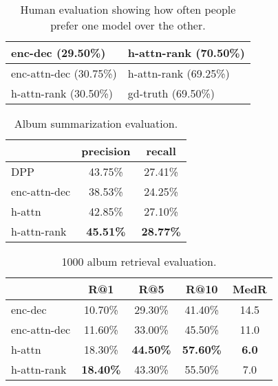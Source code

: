 \begin{table}[t]
\footnotesize
\begin{center}
\begin{tabular}{l | l}
\hline
enc-dec (29.50\%) & h-attn-rank (70.50\%)\\
\hline
enc-attn-dec (30.75\%) & h-attn-rank (69.25\%) \\
\hline
\hline
h-attn-rank (30.50\%) & gd-truth (69.50\%) \\ 
\hline
\end{tabular}
\end{center}
\vspace{-.4cm}
\caption{Human evaluation showing how often people prefer one model over the other.}
\vspace{-.2cm}
\label{table:human}
\end{table}

\begin{table}[t]
\footnotesize
\begin{center}
\begin{tabular}{l | c c }
\hline
& precision & recall \\
\hline
DPP & 43.75\% & 27.41\% \\
\hline
enc-attn-dec & 38.53\% & 24.25\% \\
\hline
h-attn 		 & 42.85\% & 27.10\% \\
\hline
h-attn-rank  & \bf{45.51}\% & \bf{28.77}\% \\
\hline
\end{tabular}
\end{center}
\vspace{-.4cm}
\caption{Album summarization evaluation.}
\vspace{-.1cm}
\label{table:summarization}
\end{table}

\begin{table}[t]
\footnotesize
\begin{center}
\begin{tabular}{l | c c c c}
\hline
& R@1 & R@5 & R@10 & MedR \\
\hline
enc-dec      & 10.70\% & 29.30\% & 41.40\% & 14.5 \\
\hline
enc-attn-dec & 11.60\% & 33.00\% & 45.50\% & 11.0 \\
\hline  
h-attn       & 18.30\% & \bf{44.50}\% & \bf{57.60}\% & \bf{6.0} \\
\hline
h-attn-rank  & \bf{18.40}\% & 43.30\% & 55.50\% & 7.0 \\
\hline
\end{tabular}
\end{center}
\vspace{-.4cm}
\caption{1000 album retrieval evaluation.}
\vspace{-.1cm}
\label{table:retrieval}
\end{table}



